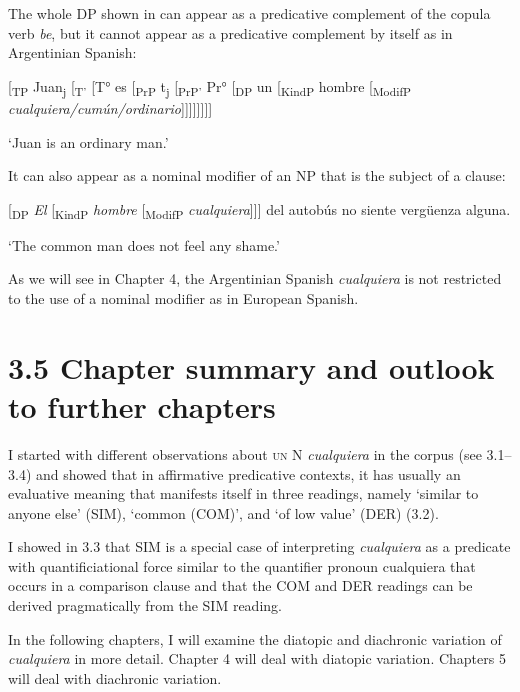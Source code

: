 The whole DP shown in  can appear as a predicative complement of the copula verb \textit{be}, but it cannot appear as a predicative complement by itself as in Argentinian Spanish:

  [\textsubscript{TP} Juan\textsubscript{j} [\textsubscript{T'} [T° es [\textsubscript{PrP} t\textsubscript{j} [\textsubscript{PrP'} Pr°\textsubscript{} [\textsubscript{DP} un [\textsubscript{KindP} hombre [\textsubscript{ModifP} \textit{cualquiera/cumún/ordinario}]]]]]]]]

  ‘Juan is an ordinary man.’

It can also appear as a nominal modifier of an NP that is the subject of a clause:

  [\textsubscript{DP} \textit{El} [\textsubscript{KindP} \textit{hombre} [\textsubscript{ModifP} \textit{cualquiera}]]] del autobús no siente vergüenza alguna.

  ‘The common man does not feel any shame.’

As we will see in Chapter 4, the Argentinian Spanish \textit{cualquiera} is not restricted to the use of a nominal modifier as in European Spanish. 

\section{\textbf{3.5} \textbf{Chapter} \textbf{summary} \textbf{and} \textbf{outlook} \textbf{to} \textbf{further} \textbf{chapters}}

I started with different observations about \textsc{un} N \textit{cualquiera} in the corpus (see 3.1–3.4) and showed that in affirmative predicative contexts, it has usually an evaluative meaning that manifests itself in three readings, namely ‘similar to anyone else’ (SIM), ‘common (COM)’, and ‘of low value’ (DER) (3.2). 

  I showed in 3.3 that SIM is a special case of interpreting \textit{cualquiera} as a predicate with quantificiational force similar to the quantifier pronoun cualquiera that occurs in a comparison clause and that the COM and DER readings can be derived pragmatically from the SIM reading. 

  In the following chapters, I will examine the diatopic and diachronic variation of \textit{cualquiera} in more detail. Chapter 4 will deal with diatopic variation. Chapters 5 will deal with diachronic variation. 

